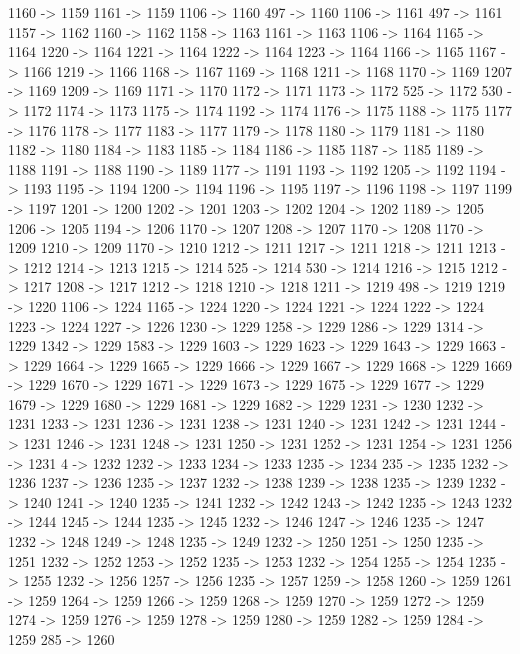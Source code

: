 {	1160 -> 1159
	1161 -> 1159
	1106 -> 1160
	497 -> 1160
	1106 -> 1161
	497 -> 1161
	1157 -> 1162
	1160 -> 1162
	1158 -> 1163
	1161 -> 1163
	1106 -> 1164
	1165 -> 1164
	1220 -> 1164
	1221 -> 1164
	1222 -> 1164
	1223 -> 1164
	1166 -> 1165
	1167 -> 1166
	1219 -> 1166
	1168 -> 1167
	1169 -> 1168
	1211 -> 1168
	1170 -> 1169
	1207 -> 1169
	1209 -> 1169
	1171 -> 1170
	1172 -> 1171
	1173 -> 1172
	525 -> 1172
	530 -> 1172
	1174 -> 1173
	1175 -> 1174
	1192 -> 1174
	1176 -> 1175
	1188 -> 1175
	1177 -> 1176
	1178 -> 1177
	1183 -> 1177
	1179 -> 1178
	1180 -> 1179
	1181 -> 1180
	1182 -> 1180
	1184 -> 1183
	1185 -> 1184
	1186 -> 1185
	1187 -> 1185
	1189 -> 1188
	1191 -> 1188
	1190 -> 1189
	1177 -> 1191
	1193 -> 1192
	1205 -> 1192
	1194 -> 1193
	1195 -> 1194
	1200 -> 1194
	1196 -> 1195
	1197 -> 1196
	1198 -> 1197
	1199 -> 1197
	1201 -> 1200
	1202 -> 1201
	1203 -> 1202
	1204 -> 1202
	1189 -> 1205
	1206 -> 1205
	1194 -> 1206
	1170 -> 1207
	1208 -> 1207
	1170 -> 1208
	1170 -> 1209
	1210 -> 1209
	1170 -> 1210
	1212 -> 1211
	1217 -> 1211
	1218 -> 1211
	1213 -> 1212
	1214 -> 1213
	1215 -> 1214
	525 -> 1214
	530 -> 1214
	1216 -> 1215
	1212 -> 1217
	1208 -> 1217
	1212 -> 1218
	1210 -> 1218
	1211 -> 1219
	498 -> 1219
	1219 -> 1220
	1106 -> 1224
	1165 -> 1224
	1220 -> 1224
	1221 -> 1224
	1222 -> 1224
	1223 -> 1224
	1227 -> 1226
	1230 -> 1229
	1258 -> 1229
	1286 -> 1229
	1314 -> 1229
	1342 -> 1229
	1583 -> 1229
	1603 -> 1229
	1623 -> 1229
	1643 -> 1229
	1663 -> 1229
	1664 -> 1229
	1665 -> 1229
	1666 -> 1229
	1667 -> 1229
	1668 -> 1229
	1669 -> 1229
	1670 -> 1229
	1671 -> 1229
	1673 -> 1229
	1675 -> 1229
	1677 -> 1229
	1679 -> 1229
	1680 -> 1229
	1681 -> 1229
	1682 -> 1229
	1231 -> 1230
	1232 -> 1231
	1233 -> 1231
	1236 -> 1231
	1238 -> 1231
	1240 -> 1231
	1242 -> 1231
	1244 -> 1231
	1246 -> 1231
	1248 -> 1231
	1250 -> 1231
	1252 -> 1231
	1254 -> 1231
	1256 -> 1231
	4 -> 1232
	1232 -> 1233
	1234 -> 1233
	1235 -> 1234
	235 -> 1235
	1232 -> 1236
	1237 -> 1236
	1235 -> 1237
	1232 -> 1238
	1239 -> 1238
	1235 -> 1239
	1232 -> 1240
	1241 -> 1240
	1235 -> 1241
	1232 -> 1242
	1243 -> 1242
	1235 -> 1243
	1232 -> 1244
	1245 -> 1244
	1235 -> 1245
	1232 -> 1246
	1247 -> 1246
	1235 -> 1247
	1232 -> 1248
	1249 -> 1248
	1235 -> 1249
	1232 -> 1250
	1251 -> 1250
	1235 -> 1251
	1232 -> 1252
	1253 -> 1252
	1235 -> 1253
	1232 -> 1254
	1255 -> 1254
	1235 -> 1255
	1232 -> 1256
	1257 -> 1256
	1235 -> 1257
	1259 -> 1258
	1260 -> 1259
	1261 -> 1259
	1264 -> 1259
	1266 -> 1259
	1268 -> 1259
	1270 -> 1259
	1272 -> 1259
	1274 -> 1259
	1276 -> 1259
	1278 -> 1259
	1280 -> 1259
	1282 -> 1259
	1284 -> 1259
	285 -> 1260
}

